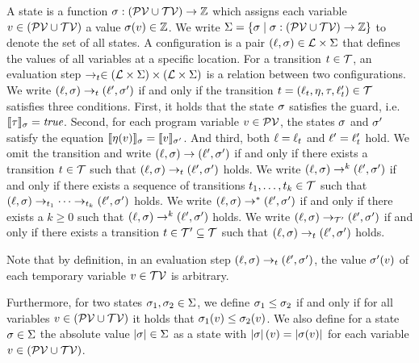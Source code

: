 \begin{definition}[Evaluation] 
  A state is a function $\sigma: (\mathcal{PV} \cup \mathcal{TV}) \rightarrow \mathbb{Z}$ which assigns each variable $v \in (\mathcal{PV} \cup \mathcal{TV})$ a value $\sigma(v) \in \mathbb{Z}$.
  We write $\Sigma = \lbrace  \sigma \mid \sigma: (\mathcal{PV} \cup \mathcal{TV}) \rightarrow \mathbb{Z} \rbrace$ to denote the set of all states.
  A configuration is a pair $(\ell, \sigma) \in \mathcal{L} \times \Sigma$ that defines the values of all variables at a specific location.
  For a transition $t \in \mathcal{T}$, an evaluation step $\rightarrow_t \in (\mathcal{L} \times \Sigma) \times (\mathcal{L} \times \Sigma)$ is a relation between two configurations.
  We write $(\ell, \sigma) \rightarrow_t (\ell', \sigma')$ if and only if the transition $t = (\ell_t, \eta, \tau, \ell_t') \in \mathcal{T}$ satisfies three conditions.
  First, it holds that the state $\sigma$ satisfies the guard, i.e. $\llbracket \tau \rrbracket_{\sigma} = \emph{true}$.
  Second, for each program variable $v \in \mathcal{PV}$, the states $\sigma$ and $\sigma'$ satisfy the equation $\llbracket \eta(v) \rrbracket_{\sigma} = \llbracket v \rrbracket_{\sigma'}$.
  And third, both $\ell = \ell_t$ and $\ell' = \ell_t'$ hold.
  We omit the transition and write $(\ell, \sigma) \rightarrow (\ell', \sigma')$ if and only if there exists a transition $t \in \mathcal{T}$ such that $(\ell, \sigma) \rightarrow_t (\ell', \sigma')$ holds.
  We write $(\ell, \sigma) \rightarrow^k (\ell', \sigma')$ if and only if there exists a sequence of transitions $t_1, \dots, t_k \in \mathcal{T}$ such that $(\ell, \sigma) \rightarrow_{t_1} \dots \rightarrow_{t_k} (\ell', \sigma')$ holds.
  We write $(\ell, \sigma) \rightarrow^* (\ell', \sigma')$ if and only if there exists a $k \geq 0$ such that $(\ell, \sigma) \rightarrow^k (\ell', \sigma')$ holds.
  We write $(\ell, \sigma) \rightarrow_{\mathcal{T}'} (\ell', \sigma')$ if and only if there exists a transition $t \in \mathcal{T}' \subseteq \mathcal{T}$ such that $(\ell, \sigma) \rightarrow_t (\ell', \sigma')$ holds.
\end{definition}

Note that by definition, in an evaluation step $(\ell, \sigma) \rightarrow_t (\ell', \sigma')$, the value $\sigma'(v)$ of each temporary variable $v \in \mathcal{TV}$ is arbitrary.

Furthermore, for two states $\sigma_1, \sigma_2 \in \Sigma$, we define $\sigma_1 \leq \sigma_2$ if and only if for all variables $v \in (\mathcal{PV} \cup \mathcal{TV})$ it holds that $\sigma_1(v) \leq \sigma_2(v)$.
We also define for a state $\sigma \in \Sigma$ the absolute value $\left|\sigma\right| \in \Sigma$ as a state with $\left|\sigma\right|(v) = \left|\sigma(v)\right|$ for each variable $v \in (\mathcal{PV} \cup \mathcal{TV})$.

